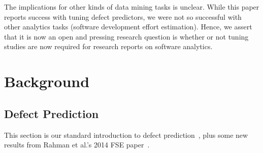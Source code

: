 \documentclass{sig-alternative}
\begin{document}
The implications for other kinds of data mining tasks is unclear.
While this paper reports success with tuning defect predictors,
we were not so successful with
other analytics tasks (software development effort estimation).
Hence, we assert that it is now an open and pressing research question is whether or not  
tuning studies are now   required for research reports on software analytics.


\section{Background}
\subsection{Defect Prediction}


This section is our standard introduction to defect prediction~\cite{me15:book1},
plus   some new results from Rahman et al.'s   2014 FSE paper~\cite{rahman14:icse}. 
 
\end{document}

